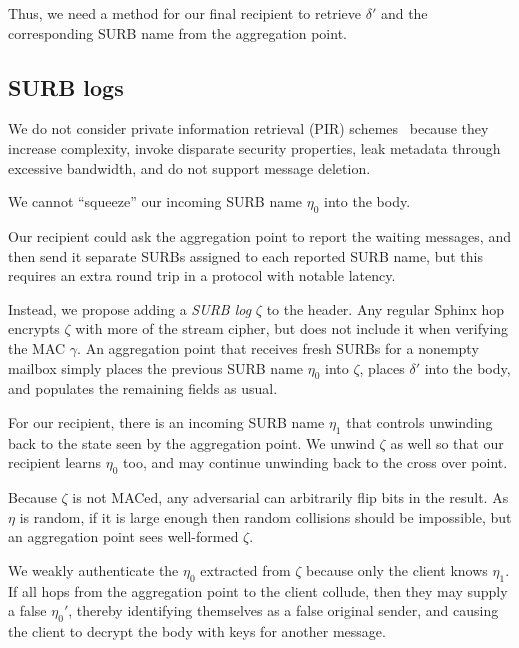 \documentclass[twoside,letterpaper]{llncs}
\begin{document}
Thus, we need a method for our final recipient to retrieve
$\delta'$ and the corresponding SURB name from the aggregation point.


\subsection{SURB logs}

We do not consider private information retrieval (PIR)
schemes~\cite{pir} because they increase complexity, invoke disparate
security properties, leak metadata through excessive bandwidth, and do
not support message deletion.

We cannot ``squeeze'' our incoming SURB name $\eta_0$ into the body.

Our recipient could ask the aggregation point to report the waiting
messages, and then send it separate SURBs assigned to each reported
SURB name, but this requires an extra round trip in a protocol with
notable latency. 

Instead, we propose adding a {\it SURB log} $\zeta$ to the header.
Any regular Sphinx hop encrypts $\zeta$ with more of the stream
cipher, but does not include it when verifying the MAC $\gamma$.
An aggregation point that receives fresh SURBs for a nonempty
mailbox simply places the previous SURB name $\eta_0$ into $\zeta$,
places $\delta'$ into the body, and populates the remaining fields
as usual.

For our recipient, there is an incoming SURB name $\eta_1$ that 
controls unwinding back to the state seen by the aggregation point.
We unwind $\zeta$ as well so that our recipient learns $\eta_0$ too,
and may continue unwinding back to the cross over point.

Because $\zeta$ is not MACed, any adversarial can arbitrarily flip
bits in the result.  As $\eta$ is random, if it is large enough then
random collisions should be impossible, but an aggregation point sees
well-formed $\zeta$.

We weakly authenticate the $\eta_0$ extracted from $\zeta$ because
only the client knows $\eta_1$.  If all hops from the aggregation
point to the client collude, then they may supply a false $\eta_0'$,
thereby identifying themselves as a false original sender, and
causing the client to decrypt the body with keys for another message.
\end{document}
